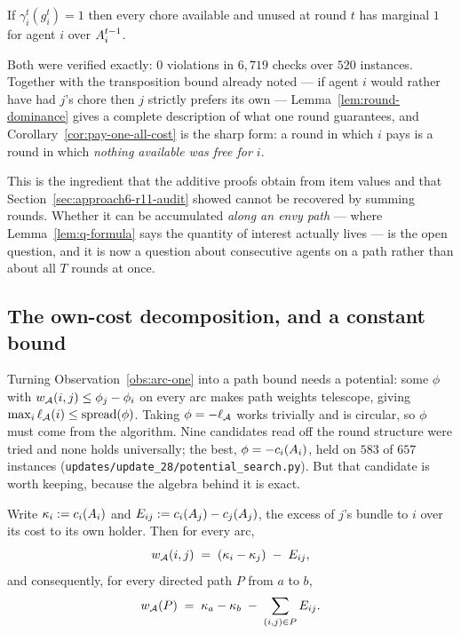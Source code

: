 \begin{corollary}
\label{cor:pay-one-all-cost}
If $\gamma_i^t(g_i^t) = 1$ then every chore available and unused at round $t$ has
marginal $1$ for agent $i$ over $A_{i}^{t-1}$.
\end{corollary}

Both were verified exactly: $0$ violations in $6{,}719$ checks over $520$
instances. Together with the transposition bound already noted --- if agent $i$
would rather have had $j$'s chore then $j$ strictly prefers its own ---
Lemma~\ref{lem:round-dominance} gives a complete description of what one round
guarantees, and Corollary~\ref{cor:pay-one-all-cost} is the sharp form: a round in
which $i$ pays is a round in which \emph{nothing available was free for $i$}.

This is the ingredient that the additive proofs obtain from item values and that
Section~\ref{sec:approach6-r11-audit} showed cannot be recovered by summing
rounds. Whether it can be accumulated \emph{along an envy path} --- where
Lemma~\ref{lem:q-formula} says the quantity of interest actually lives --- is the
open question, and it is now a question about consecutive agents on a path rather
than about all $T$ rounds at once.

\subsection{The own-cost decomposition, and a constant bound}
\label{sec:approach6-kappa}

Turning Observation~\ref{obs:arc-one} into a path bound needs a potential: some
$\phi$ with $w_{\mathcal{A}}(i,j) \le \phi_j - \phi_i$ on every arc makes path
weights telescope, giving $\max_i \ell_{\mathcal{A}}(i) \le \operatorname{spread}(\phi)$.
Taking $\phi = -\ell_{\mathcal{A}}$ works trivially and is circular, so $\phi$ must
come from the algorithm. Nine candidates read off the round structure were tried
and none holds universally; the best, $\phi = -c_i(A_{i})$, held on
$583$ of $657$ instances (\texttt{updates/update\_28/potential\_search.py}). But that
candidate is worth keeping, because the algebra behind it is exact.

\begin{lemma}
\label{lem:kappa-identity}
Write $\kappa_i := c_i(A_{i})$ and
$E_{ij} := c_i(A_{j}) - c_j(A_{j})$, the excess of $j$'s bundle
to $i$ over its cost to its own holder. Then for every arc,
\[
  w_{\mathcal{A}}(i,j) \;=\; (\kappa_i - \kappa_j) \;-\; E_{ij},
\]
and consequently, for every directed path $P$ from $a$ to $b$,
\[
  w_{\mathcal{A}}(P) \;=\; \kappa_a - \kappa_b \;-\; \sum_{(i,j) \in P} E_{ij}.
\]
\end{lemma}


